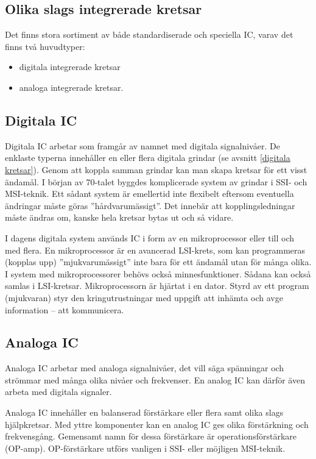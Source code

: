 \subsection{Olika slags integrerade kretsar}

Det finns stora sortiment av både standardiserade och speciella IC, varav det
finns två huvudtyper:
\begin{itemize}
  \item digitala integrerade kretsar
  \item analoga integrerade kretsar.
\end{itemize}

\subsection{Digitala IC}

Digitala IC arbetar som framgår av namnet med digitala signalnivåer. De enklaste
typerna innehåller en eller flera digitala grindar (se avsnitt
\ref{digitala kretsar}).
Genom att koppla samman grindar kan man skapa kretsar för ett visst ändamål.
I början av 70-talet byggdes komplicerade system av grindar i SSI- och
MSI-teknik.
Ett sådant system är emellertid inte flexibelt eftersom eventuella ändringar
måste göras ''hårdvarumässigt''.
Det innebär att kopplingsledningar måste ändras om, kanske hela kretsar bytas
ut och så vidare.

I dagens digitala system används IC i form av en mikroprocessor eller till och med
flera. En mikroprocessor är en avancerad LSI-krets, som kan programmeras
(kopplas upp) ''mjukvarumässigt'' inte bara för ett ändamål utan för många
olika. I system med mikroprocessorer behövs också minnesfunktioner. Sådana kan
också samlas i LSI-kretsar. Mikroprocessorn är hjärtat i en dator. Styrd av ett
program (mjukvaran) styr den kringutrustningar med uppgift att inhämta och avge
information -- att kommunicera.

\subsection{Analoga IC}

Analoga IC arbetar med analoga signalnivåer, det vill säga spänningar och strömmar med
många olika nivåer och frekvenser. En analog IC kan därför även arbeta med
digitala signaler.

Analoga IC innehåller en balanserad förstärkare eller flera samt olika slags
hjälpkretsar. Med yttre komponenter kan en analog IC ges olika förstärkning och
frekvensgång. Gemensamt namn för dessa förstärkare är operationsförstärkare
(OP-amp). OP-förstärkare utförs vanligen i SSI- eller möjligen MSI-teknik.

